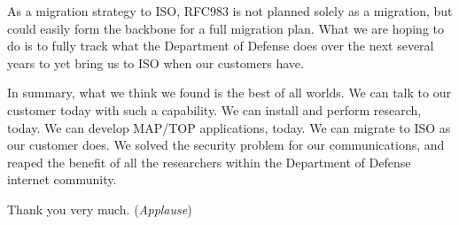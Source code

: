 As a migration strategy to ISO, RFC983 is not planned solely as a migration,
but could easily form the backbone for a full migration plan.  What we are
hoping to do is to fully track what the Department of Defense does over the
next several years to yet bring us to ISO when our customers have.

In summary, what we think we found is the best of all worlds.  We can talk
to our customer today with such a capability.  We can install and perform
research, today.  We can develop MAP/TOP applications, today.  We can migrate
to ISO as our customer does.  We solved the security problem for our
communications, and reaped the benefit of all the researchers within the
Department of Defense internet community.

Thank you very much.  ({\em Applause\/})


